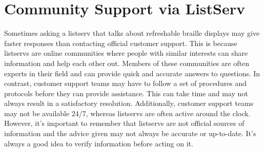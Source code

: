 \pagebreak \hypertarget{listserv2}{}\section{Community Support via ListServ}\label{listserv2}
Sometimes asking a listserv that talks about refreshable braille displays may give faster responses than contacting official customer support. This is because listservs are online communities where people with similar interests can share information and help each other out. Members of these communities are often experts in their field and can provide quick and accurate answers to questions. In contrast, customer support teams may have to follow a set of procedures and protocols before they can provide assistance. This can take time and may not always result in a satisfactory resolution. Additionally, customer support teams may not be available 24/7, whereas listservs are often active around the clock. However, it’s important to remember that listservs are not official sources of information and the advice given may not always be accurate or up-to-date. It’s always a good idea to verify information before acting on it.
